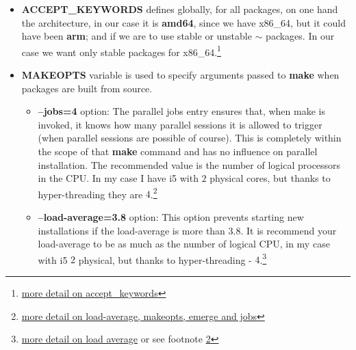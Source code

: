 \documentclass[10pt,a4paper]{article}
\begin{document}
\begin{enumerate}
\begin{enumerate}[label*=\arabic*.]
\begin{itemize}
				
				
				\item \textbf{ACCEPT\_KEYWORDS} defines globally, for all packages, on one hand the architecture, in our case it is \textbf{amd64}, since we have x86\_64, but it could have been \textbf{arm}; and if we are to use stable or unstable \textbf{$ \sim $} packages. In our case we want only stable packages for x86\_64.\footnote{ \href{https://wiki.gentoo.org/wiki/ACCEPT_KEYWORDS}{more detail on accept\_keywords}}

				
				
				\item \textbf{MAKEOPTS} variable is used to specify arguments passed to \textbf{make} when packages are built from source.

				
				
				\begin{itemize}[label={o}]
					
					\item \textbf{--jobs=4} option: The parallel jobs entry ensures that, when make is invoked, it knows how many parallel sessions it is allowed to trigger (when parallel sessions are possible of course). This is completely within the scope of that \textbf{make} command and has no influence on parallel installation. The recommended value is the number of logical processors in the CPU. In my case I have i5 with $ 2 $ physical cores, but thanks to hyper-threading they are $ 4 $.\footnote{ \label{jobs-load-avg-details} \href{https://lists.gt.net/gentoo/user/269934}{more detail on load-average, makeopts, emerge and jobs}}
					
					\item \textbf{--load-average=3.8} option: This option prevents starting new installations if the load-average is more than $ 3.8 $. It is recommend your load-average to be as much as the number of logical CPU, in my case with i5 $ 2 $ physical, but thanks to hyper-threading - $ 4 $.\footnote{\label{load-avg-explained-note} \href{http://blog.scoutapp.com/articles/2009/07/31/understanding-load-averages}{more detail on load average} or see footnote \ref{jobs-load-avg-details} }

				\end{itemize}
				

\end{itemize}
\end{enumerate}
\end{enumerate}
\end{document}
